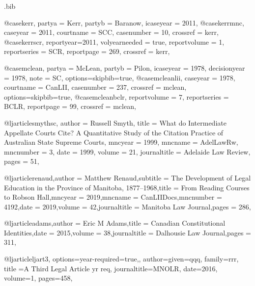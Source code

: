 \begin{filecontents*}{\jobname.bib}

@case{kerr,
  partya = {Kerr}, 
  partyb = {Baranow},
  icaseyear = {2011},
  }
@case{kerrmnc,
  caseyear = {2011},
  courtname = {SCC},
  casenumber = {10},
  crossref = {kerr},
  }
@case{kerrscr,
  reportyear={2011},
  volyearneeded = {true},
  reportvolume = {1},
  reportseries = {SCR},
  reportpage = {269},
  crossref = {kerr},
  	}





@case{mclean,
  partya = {McLean}, 
  partyb = {Pilon},
  icaseyear = {1978},
  decisionyear = {1978},
  note = {SC},
  options={skipbib=true},
  }
@case{mcleanlii,
  caseyear = {1978},
  courtname = {CanLII},
  casenumber = {237},
  crossref = {mclean},
  options={skipbib=true},
  }
@case{mcleanbclr,
  reportvolume = {7},
  reportseries = {BCLR},
  reportpage = {99},
  crossref = {mclean},
  	}








@ljarticle{smythsc,
author = {Russell Smyth},
title = {What do Intermediate Appellate Courts Cite? A Quantitative Study of the Citation Practice of Australian State Supreme Courts},
mncyear = {1999},
mncname = {AdelLawRw},
mncnumber = {3},
date = {1999},
volume = {21},
journaltitle = {Adelaide Law Review},
pages = {51},
}

@ljarticle{renaud,author = {Matthew Renaud},subtitle = {The Development of Legal Education in the Province of Manitoba, 1877–1968},title = {From Reading Courses to Robson Hall},mncyear = {2019},mncname = {CanLIIDocs},mncnumber = {4192},date = {2019},volume = {42},journaltitle = {Manitoba Law Journal},pages = {286},}

@ljarticle{adams,author = {Eric M Adams},title = {Canadian Constitutional Identities},date = {2015},volume = {38},journaltitle = {Dalhousie Law Journal},pages = {311},}



@ljarticle{ljart3,
options={year-required=true,},
author={given=qqq, family=rrr},
title ={A Third Legal Article yr req},
journaltitle={MNOLR},
date={2016},
volume={1},
pages={458},
}


\end{filecontents*}
